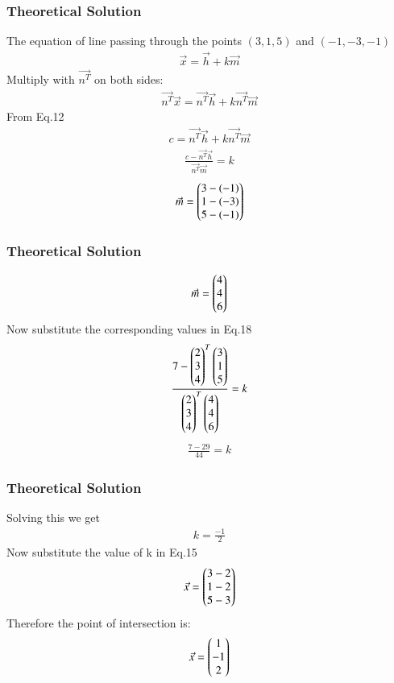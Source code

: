 \documentclass{beamer}
\begin{document}
\begin{frame}
\frametitle{Theoretical Solution}

The equation of line passing through the points $(3,1,5)$ and $(-1,-3,-1)$
\begin{align}
    \Vec{x}=\Vec{h}+k\Vec{m}
\end{align}
Multiply with $\Vec{n^T}$ on both sides:
\begin{align}
    \Vec{n^T}\Vec{x}=\Vec{n^T}\Vec{h}+k\Vec{n^T}\Vec{m}
\end{align}
From Eq.12
\begin{align}
    c=\Vec{n^T}\Vec{h}+k\Vec{n^T}\Vec{m}
\end{align}
\begin{align}
   \frac{ c-\Vec{n^T}\Vec{h}}{\Vec{n^T}\Vec{m}}=k
\end{align}
\begin{align}
    \Vec{m}=\begin{pmatrix}3-(-1)\\1-(-3)\\5-(-1)\end{pmatrix}
\end{align}

\end{frame}

\begin{frame}
\frametitle{Theoretical Solution}
  \begin{align}
     \Vec{m}=\begin{pmatrix}4\\4\\6\end{pmatrix}
\end{align}
Now substitute the corresponding values in Eq.18
\begin{align}
   \frac{7-\begin{pmatrix}2\\3\\4\end{pmatrix}^T\begin{pmatrix}3\\1\\5\end{pmatrix}}{\begin{pmatrix}2\\3\\4\end{pmatrix}^T\begin{pmatrix}4\\4\\6\end{pmatrix}}=k
\end{align}
\begin{align}
    \frac{7-29}{44}=k
\end{align}


\end{frame}

\begin{frame}
\frametitle{Theoretical Solution}
   Solving this we get
\begin{align}
k=\frac{-1}{2}
\end{align}
Now substitute the value of k in Eq.15
\begin{align}
    \Vec{x}=\begin{pmatrix}3-2\\1-2\\5-3\end{pmatrix}
\end{align}
Therefore the point of intersection is:
\begin{align}
    \Vec{x}=\begin{pmatrix}1\\-1\\2\end{pmatrix}
\end{align}
\end{frame}
\end{document}

